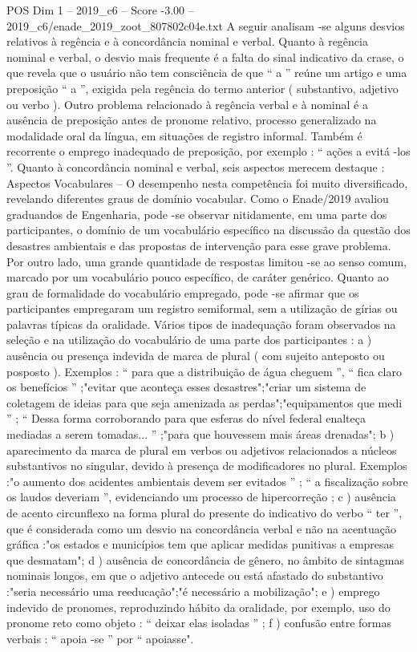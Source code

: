 \begin{textsample}{POS Dim 1 – 2019\_c6 – Score -3.00 – 2019\_c6/enade\_2019\_zoot\_807802c04e.txt}
A seguir analisam -se alguns desvios relativos à regência e à concordância nominal e verbal.
Quanto à regência nominal e verbal, o desvio mais frequente é a falta do sinal indicativo da crase, o que revela que o usuário não tem consciência de que “ a ” reúne um artigo e uma preposição “ a ”, exigida pela regência do termo anterior ( substantivo, adjetivo ou verbo ).
Outro problema relacionado à regência verbal e à nominal é a ausência de preposição antes de pronome relativo, processo generalizado na modalidade oral da língua, em situações de registro informal.
Também é recorrente o emprego inadequado de preposição, por exemplo : “ ações a evitá -los ”.
Quanto à concordância nominal e verbal, seis aspectos merecem destaque : Aspectos Vocabulares – O desempenho nesta competência foi muito diversificado, revelando diferentes graus de domínio vocabular.
Como o Enade/2019 avaliou graduandos de Engenharia, pode -se observar nitidamente, em uma parte dos participantes, o domínio de um vocabulário específico na discussão da questão dos desastres ambientais e das propostas de intervenção para esse grave problema.
Por outro lado, uma grande quantidade de respostas limitou -se ao senso comum, marcado por um vocabulário pouco específico, de caráter genérico.
Quanto ao grau de formalidade do vocabulário empregado, pode -se afirmar que os participantes empregaram um registro semiformal, sem a utilização de gírias ou palavras típicas da oralidade.
Vários tipos de inadequação foram observados na seleção e na utilização do vocabulário de uma parte dos participantes : a ) ausência ou presença indevida de marca de plural ( com sujeito anteposto ou posposto ).
Exemplos : “ para que a distribuição de água cheguem ”, “ fica claro os benefícios ” ;"evitar que aconteça esses desastres";"criar um sistema de coletagem de ideias para que seja amenizada as perdas";"equipamentos que medi ” ; “ Dessa forma corroborando para que esferas do nível federal enalteça mediadas a serem tomadas... ” ;"para que houvessem mais áreas drenadas"; b ) aparecimento da marca de plural em verbos ou adjetivos relacionados a núcleos substantivos no singular, devido à presença de modificadores no plural.
Exemplos :"o aumento dos acidentes ambientais devem ser evitados ” ; “ a fiscalização sobre os laudos deveriam ”, evidenciando um processo de hipercorreção ; c ) ausência de acento circunflexo na forma plural do presente do indicativo do verbo “ ter ”, que é considerada como um desvio na concordância verbal e não na acentuação gráfica :"os estados e municípios tem que aplicar medidas punitivas a empresas que desmatam"; d ) ausência de concordância de gênero, no âmbito de sintagmas nominais longos, em que o adjetivo antecede ou está afastado do substantivo :"seria necessário uma reeducação";"é necessário a mobilização"; e ) emprego indevido de pronomes, reproduzindo hábito da oralidade, por exemplo, uso do pronome reto como objeto : “ deixar elas isoladas ” ; f ) confusão entre formas verbais : “ apoia -se ” por “ apoiasse".

\end{textsample}
